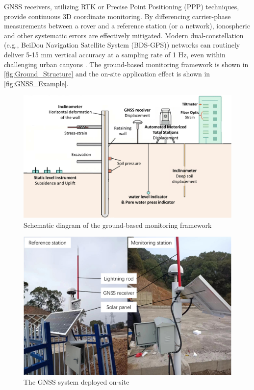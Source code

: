 \documentclass[preprint,11pt,authoryear,3p]{elsarticle}
\begin{document}
GNSS receivers, utilizing RTK or Precise Point Positioning (PPP) techniques, provide continuous 3D coordinate monitoring. By differencing carrier-phase measurements between a rover and a reference station (or a network), ionospheric and other systematic errors are effectively mitigated. Modern dual-constellation (e.g., BeiDou Navigation Satellite System (BDS-GPS)) networks can routinely deliver 5-15 mm vertical accuracy at a sampling rate of 1 Hz, even within challenging urban canyons \citep{marut2024affordable,huang2023gnss}. The ground-based monitoring framework is shown in \autoref{fig:Ground_Structure} and the on-site application effect is shown in \autoref{fig:GNSS_Example}.

\begin{figure}
  \centering
  \includegraphics[width=\textwidth]{imgs/Ground_Structure.pdf}
  \caption{Schematic diagram of the ground-based monitoring framework}
  \label{fig:Ground_Structure}
\end{figure}

\begin{figure}
  \centering
  \includegraphics[width=\textwidth]{imgs/GNSSMonitoring.pdf}
  \caption{The GNSS system deployed on-site}
  \label{fig:GNSS_Example}
\end{figure}
\end{document}
